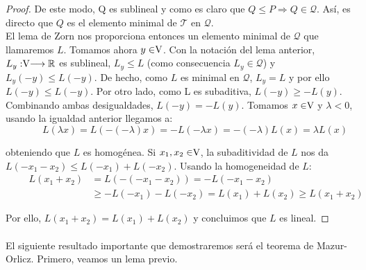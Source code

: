 \begin{proof}
		De este modo, Q es sublineal y como es claro que $ Q \leq P \Longrightarrow Q \in \mathcal{Q}$. Así, es directo que $ Q $ es el elemento minimal de $ \mathcal{T} $ en $\mathcal{Q}$.\\
		
		El lema de Zorn nos proporciona entonces un elemento minimal de $ \mathcal{Q} $ que llamaremos $ L $. Tomamos ahora $ y \in \vecSpace $. Con la notación del lema anterior, $ L_y : \vecSpace \longrightarrow \RR $ es sublineal, $ L_y \leq L $ (como consecuencia $ L_y \in \mathcal{Q} $) y $ L_y (-y) \leq L(-y) $. De hecho, como $ L $ es minimal en $ \mathcal{Q} $, $ L_y = L $ y por ello $ L (-y) \leq L(-y) $. Por otro lado, como L es subaditiva, $ L(-y) \geq -L(y) $. Combinando ambas desigualdades, $ L(-y) = -L(y) $. Tomamos $ x \in \vecSpace $ y $ \lambda < 0 $, usando la igualdad anterior llegamos a:
		\[ \qquad \quad
		L(\lambda x) = L (-(-\lambda)x) = -L(-\lambda x) = -(-\lambda)L(x) = \lambda L(x) \label{1}
		\] 
		
		obteniendo que $ L $ es homogénea. Si $ x_1, x_2 \in \vecSpace $, la subaditividad de $ L $ nos da $ L(-x_1-x_2) \leq L(-x_1) + L(-x_2) $. Usando la homogeneidad de $ L $:
		\begin{equation*}
		\begin{split} \qquad
		L(x_1+x_2) &= L(-(-x_1-x_2)) = -L(-x_1-x_2) \\ 
		& \geq -L(-x_1)-L(-x_2) = L(x_1) + L (x_2) \geq L(x_1+x_2) 
		\end{split}
		\end{equation*}
		
		Por ello, $	L(x_1+x_2) = L(x_1) + L (x_2) $ y concluimos que $ L $ es lineal.
		
	\end{proof}

	\paragraph{} El siguiente resultado importante que demostraremos será el teorema de Mazur-Orlicz. Primero, veamos un lema previo.
	
